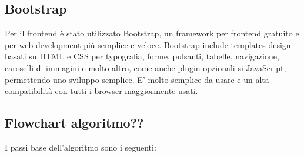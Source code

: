 \subsection{Bootstrap}
Per il frontend è stato utilizzato Bootstrap, un framework per frontend gratuito e per web development più semplice e veloce. 
Bootstrap include templates design basati su HTML e CSS per typografia, forme, pulsanti, tabelle, navigazione, caroselli di 
immagini e molto altro, come anche plugin opzionali si JavaScript, permettendo uno sviluppo semplice. 
E' molto semplice da usare e un alta compatibilità con tutti i browser maggiormente usati. 


\subsection{Flowchart algoritmo??}
I passi base dell'algoritmo sono i seguenti: 

